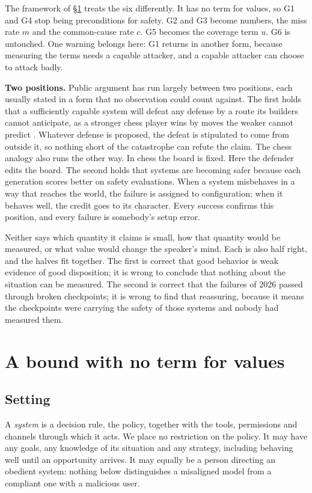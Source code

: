\documentclass[10pt,twocolumn]{article}
\theoremstyle{plain}
\theoremstyle{definition}
\newcommand{\para}[1]{\smallskip\noindent\textbf{#1}\enspace}
\begin{document}
The framework of \S\ref{sec:bound} treats the six differently. It has no term for values, so
G1 and G4 stop being preconditions for safety. G2 and G3 become numbers, the miss rate $m$
and the common-cause rate $c$. G5 becomes the coverage term $u$. G6 is untouched. One warning
belongs here: G1 returns in another form, because measuring the terms needs a capable
attacker, and a capable attacker can choose to attack badly.

\para{Two positions.} Public argument has run largely between two positions, each usually
stated in a form that no observation could count against. The first holds that a sufficiently capable system
will defeat any defense by a route its builders cannot anticipate, as a stronger chess player
wins by moves the weaker cannot predict \cite{yudkowsky2025}. Whatever defense is proposed,
the defeat is stipulated to come from outside it, so nothing short of the catastrophe can
refute the claim. The chess analogy also runs the other way. In chess the board is fixed. Here the
defender edits the board. The second holds that systems are becoming safer because each generation
scores better on safety evaluations. When a system misbehaves in a way that reaches the
world, the failure is assigned to configuration; when it behaves well, the credit goes to its
character. Every success confirms this position, and every failure is somebody's setup
error.

Neither says which quantity it claims is small, how that quantity would be measured, or what
value would change the speaker's mind. Each is also half right, and the halves fit together.
The first is correct that good behavior is weak evidence of good disposition; it is wrong to
conclude that nothing about the situation can be measured. The second is correct that the
failures of 2026 passed through broken checkpoints; it is wrong to find that reassuring,
because it means the checkpoints were carrying the safety of those systems and nobody had
measured them.

\section{A bound with no term for values}\label{sec:bound}

\subsection{Setting}

A \emph{system} is a decision rule, the policy, together with the tools, permissions and
channels through which it acts. We place no restriction on the policy. It may have any goals,
any knowledge of its situation and any strategy, including behaving well until an opportunity
arrives. It may equally be a person directing an
obedient system: nothing below distinguishes a misaligned model from a compliant one with a
malicious user.
\end{document}
